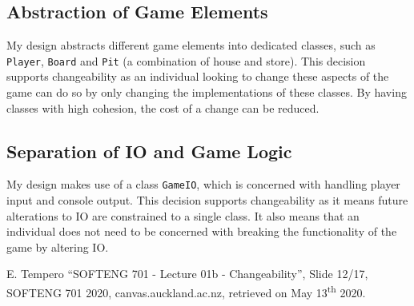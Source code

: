 \documentclass[10pt, a4paper, conference]{IEEEtran}
\begin{document}
\subsection{Abstraction of Game Elements}
My design abstracts different game elements into dedicated classes, such as
\texttt{Player}, \texttt{Board} and \texttt{Pit} (a combination of house and
store). This decision supports changeability as an individual looking to change
these aspects of the game can do so by only changing the implementations of
these classes. By having classes with high cohesion, the cost of a change can
be reduced.

\subsection{Separation of IO and Game Logic}
My design makes use of a class \texttt{GameIO}, which 
is concerned with handling player input and console output.
This decision supports changeability as it means future alterations to IO are
constrained to a single class. It also means that an individual does not need
to be concerned with breaking the functionality of the game by altering IO.

\begin{thebibliography}{00}
 E. Tempero ``SOFTENG 701 - Lecture 01b
  - Changeability'', Slide 12/17, SOFTENG 701 2020, canvas.auckland.ac.nz,
    retrieved on May 13\textsuperscript{th} 2020.
\end{thebibliography}
\end{document}
